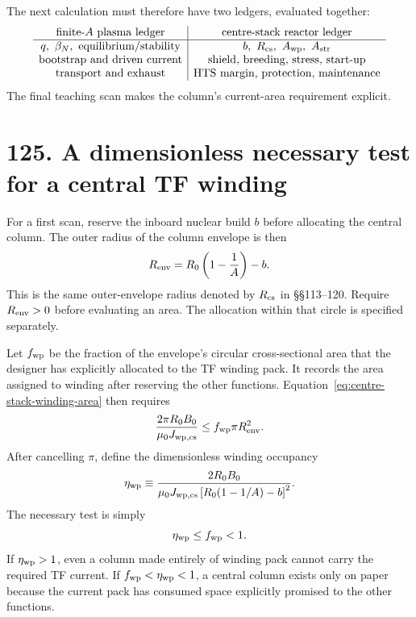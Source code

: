 \documentclass[11pt]{article}
\begin{document}
The next calculation must therefore have two ledgers, evaluated together:
\[
\begin{array}{c|c}
\text{finite-$A$ plasma ledger} & \text{centre-stack reactor ledger}\\ \hline
q,\ \beta_N,\ \text{equilibrium/stability} &
b,\ R_{\rm cs},\ A_{\rm wp},\ A_{\rm str}\\
\text{bootstrap and driven current} &
\text{shield, breeding, stress, start-up}\\
\text{transport and exhaust} &
\text{HTS margin, protection, maintenance}
\end{array}
\]
The final teaching scan makes the column's current-area requirement explicit.

\section*{125. A dimensionless necessary test for a central TF winding}
For a first scan, reserve the inboard nuclear build $b$ before allocating the
central column. The outer radius of the column envelope is then
\begin{equation}
 R_{\rm env}=R_0\left(1-\frac1A\right)-b.
 \label{eq:centre-stack-envelope}
\end{equation}
This is the same outer-envelope radius denoted by $R_{\rm cs}$ in \S\S113--120.
Require $R_{\rm env}>0$ before evaluating an area. The allocation within that
circle is specified separately.

Let $f_{\rm wp}$ be the fraction of the envelope's circular cross-sectional area
that the designer has explicitly allocated to the TF winding pack. It records the
area assigned to winding after reserving the other functions.
Equation~\eqref{eq:centre-stack-winding-area} then requires
\[
 \frac{2\pi R_0B_0}{\mu_0J_{\rm wp,cs}}\le f_{\rm wp}\pi R_{\rm env}^2.
\]
After cancelling $\pi$, define the dimensionless winding occupancy
\begin{equation}
 \eta_{\rm wp}\equiv
 \frac{2R_0B_0}
 {\mu_0J_{\rm wp,cs}\left[R_0(1-1/A)-b\right]^2}.
 \label{eq:centre-stack-winding-occupancy}
\end{equation}
The necessary test is simply
\begin{equation}
 \eta_{\rm wp}\le f_{\rm wp}<1.
 \label{eq:centre-stack-winding-test}
\end{equation}
If $\eta_{\rm wp}>1$, even a column made entirely of winding pack cannot carry the
required TF current. If $f_{\rm wp}<\eta_{\rm wp}<1$, a central column exists only
on paper because the current pack has consumed space explicitly promised to the other functions.
\end{document}
